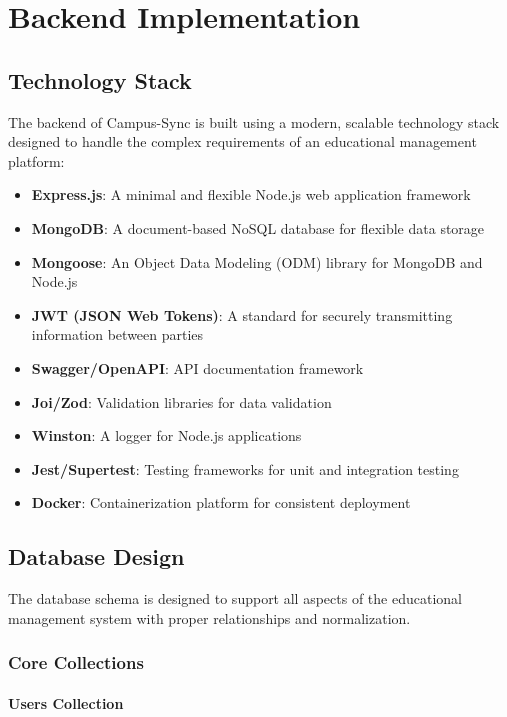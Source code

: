 \chapter{Backend Implementation}

\section{Technology Stack}

The backend of Campus-Sync is built using a modern, scalable technology stack designed to handle the complex requirements of an educational management platform:

\begin{itemize}
    \item \textbf{Express.js}: A minimal and flexible Node.js web application framework
    \item \textbf{MongoDB}: A document-based NoSQL database for flexible data storage
    \item \textbf{Mongoose}: An Object Data Modeling (ODM) library for MongoDB and Node.js
    \item \textbf{JWT (JSON Web Tokens)}: A standard for securely transmitting information between parties
    \item \textbf{Swagger/OpenAPI}: API documentation framework
    \item \textbf{Joi/Zod}: Validation libraries for data validation
    \item \textbf{Winston}: A logger for Node.js applications
    \item \textbf{Jest/Supertest}: Testing frameworks for unit and integration testing
    \item \textbf{Docker}: Containerization platform for consistent deployment
\end{itemize}

\section{Database Design}

The database schema is designed to support all aspects of the educational management system with proper relationships and normalization.

\subsection{Core Collections}

\subsubsection{Users Collection}

